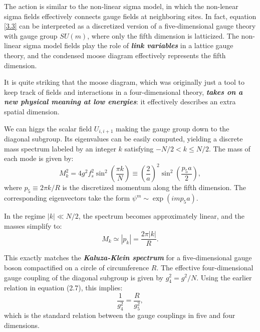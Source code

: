 \documentclass[12pt]{article}
\numberwithin{equation}{section}
\newcommand{\tif}[1]{\textit{\textbf{#1}}}
\begin{document}
    The action is similar to the non-linear sigma model, in which the non-lenear sigma fields effectively connects gauge fields at neighboring sites. In fact, equation \eqref{3.3} can be interpreted as a discretized version of a five-dimensional gauge theory with gauge group $SU(m)$, where only the fifth dimension is latticized. The non-linear sigma model fields play the role of \tif{link variables} in a lattice gauge theory, and the condensed moose diagram effectively represents the fifth dimension.

    It is quite striking that the moose diagram, which was originally just a tool to keep track of fields and interactions in a four-dimensional theory, \tif{takes on a new physical meaning at low energies}: it effectively describes an extra spatial dimension.

We can higgs the scalar field $U_{i,i+1}$ making the gauge group down to the diagonal subgroup. Its eigenvalues can be easily computed, yielding a discrete mass spectrum labeled by an integer $k$ satisfying $-N/2 < k \leq N/2$. The mass of each mode is given by:
\begin{equation}
M_k^2 = 4g^2 f_s^2 \sin^2\left( \frac{\pi k}{N} \right)
\equiv \left( \frac{2}{a} \right)^2 \sin^2\left( \frac{p_5 a}{2} \right),
\end{equation}
where $p_5 \equiv 2\pi k / R$ is the discretized momentum along the fifth dimension. The corresponding eigenvectors take the form $\psi^m \sim \exp(i m p_5 a)$.

In the regime $|k| \ll N/2$, the spectrum becomes approximately linear, and the masses simplify to:
\begin{equation}
M_k \simeq |p_k| = \frac{2\pi |k|}{R}.
\end{equation}

This exactly matches the \tif{Kaluza-Klein spectrum} for a five-dimensional gauge boson compactified on a circle of circumference $R$. The effective four-dimensional gauge coupling of the diagonal subgroup is given by $g_4^2 = g^2 / N$. Using the earlier relation in equation (2.7), this implies:
\begin{equation}
\frac{1}{g_4^2} = \frac{R}{g_5^2},
\end{equation}
which is the standard relation between the gauge couplings in five and four dimensions.
\end{document}
